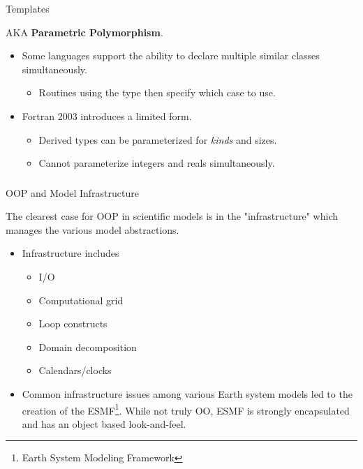 \documentclass[11pt]{beamer}
\begin{document}

\begin{frame}{Templates}

AKA \textbf{Parametric Polymorphism}.
\begin{itemize}

  \item Some languages support the ability to declare multiple similar classes simultaneously.
    \begin{itemize}
    \item Routines using the type then specify which case to use.
    \end{itemize}

  \item Fortran 2003 introduces a limited form.
    \begin{itemize}
    \item Derived types can be parameterized for \emph{kinds} and sizes.
    \item Cannot parameterize integers and reals simultaneously.
    \end{itemize}
  
 \end{itemize}

\end{frame}


\begin{frame}[fragile]
\frametitle{}



\end{frame}


\begin{frame}{OOP and Model Infrastructure}

The clearest case for OOP in scientific models is in the "infrastructure" which manages the various model abstractions.
\begin{itemize}

  \item Infrastructure includes
    \begin{itemize}
    \item I/O
    \item Computational grid
    \item Loop constructs
    \item Domain decomposition
    \item Calendars/clocks
    \end{itemize}

  \item Common infrastructure issues among various Earth system models led to the creation of the ESMF\footnote{Earth System Modeling Framework}. While not truly OO, ESMF is strongly encapsulated and has an object based look-and-feel.
  
 \end{itemize}

\end{frame}
\end{document}
